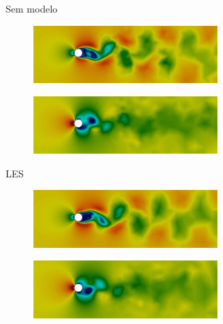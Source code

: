 \begin{figure}[h!]
\begin{subfigure}{\textwidth}
\begin{subfigure}{.49\textwidth}
        \end{subfigure}
        \caption{Sem modelo}
    \end{subfigure}
    \begin{subfigure}{\textwidth}\centering
        \begin{subfigure}{.49\textwidth}
            \includegraphics[width=\linewidth]{Figuras/cylinder/analise2/LES-Lin-u.png}
        \end{subfigure}
        \begin{subfigure}{.49\textwidth}
            \includegraphics[width=\linewidth]{Figuras/cylinder/analise2/LES-Lin-p.png}
        \end{subfigure}
        \caption{LES}
    \end{subfigure}
    \begin{subfigure}{\textwidth}\centering
        \begin{subfigure}{.49\textwidth}
            \includegraphics[width=\linewidth]{Figuras/cylinder/analise2/VMS-Lin-u.png}
        \end{subfigure}
        \begin{subfigure}{.49\textwidth}
            \includegraphics[width=\linewidth]{Figuras/cylinder/analise2/VMS-Lin-p.png}

\end{subfigure}
\end{subfigure}
\end{figure}

